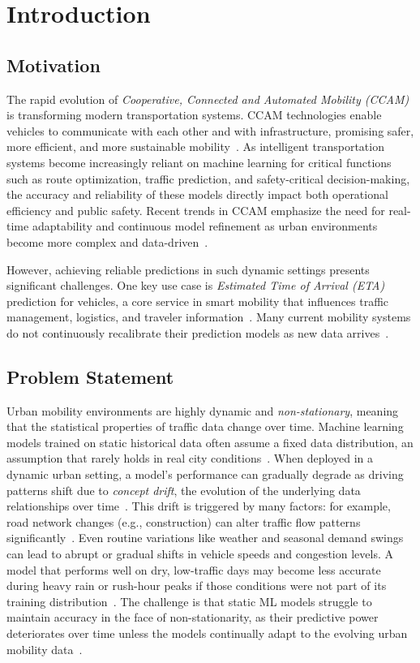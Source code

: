 \chapter{Introduction}
\label{ch:intro}

\section{Motivation}

The rapid evolution of \textit{Cooperative, Connected and Automated Mobility (CCAM)} is transforming modern transportation systems.
CCAM technologies enable vehicles to communicate with each other and with infrastructure, promising safer, more efficient, and more sustainable mobility~\cite{ertrac2022ccam}.
As intelligent transportation systems become increasingly reliant on machine learning for critical functions such as route optimization, traffic prediction, and safety-critical decision-making, the accuracy and reliability of these models directly impact both operational efficiency and public safety.
Recent trends in CCAM emphasize the need for real-time adaptability and continuous model refinement as urban environments become more complex and data-driven~\cite{abdi2021travel}.

However, achieving reliable predictions in such dynamic settings presents significant challenges.
One key use case is \textit{Estimated Time of Arrival (ETA)} prediction for vehicles, a core service in smart mobility that influences traffic management, logistics, and traveler information~\cite{abdi2021travel}.
Many current mobility systems do not continuously recalibrate their prediction models as new data arrives~\cite{arifi2024eta}.

\section{Problem Statement}

Urban mobility environments are highly dynamic and \textit{non-stationary}, meaning that the statistical properties of traffic data change over time.
Machine learning models trained on static historical data often assume a fixed data distribution, an assumption that rarely holds in real city conditions~\cite{gama2014survey}.
When deployed in a dynamic urban setting, a model's performance can gradually degrade as driving patterns shift due to \textit{concept drift}, the evolution of the underlying data relationships over time~\cite{lu2018learning}.
This drift is triggered by many factors: for example, road network changes (e.g., construction) can alter traffic flow patterns significantly~\cite{maheshwari2025survey}.
Even routine variations like weather and seasonal demand swings can lead to abrupt or gradual shifts in vehicle speeds and congestion levels.
A model that performs well on dry, low-traffic days may become less accurate during heavy rain or rush-hour peaks if those conditions were not part of its training distribution~\cite{baier2020error}.
The challenge is that static ML models struggle to maintain accuracy in the face of non-stationarity, as their predictive power deteriorates over time unless the models continually adapt to the evolving urban mobility data~\cite{gama2014survey}.

